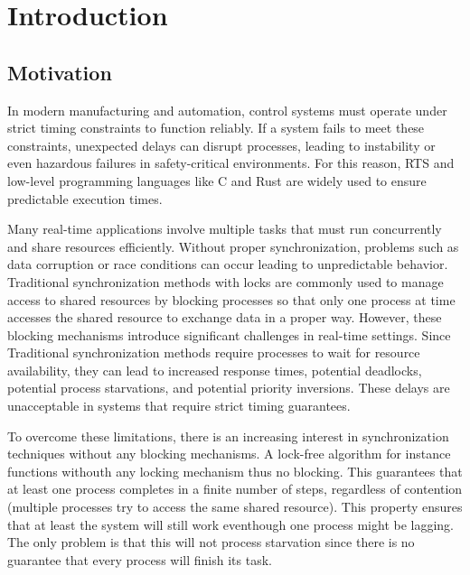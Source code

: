 \chapter{Introduction}\label{ch:introduction}

\section{Motivation}\label{sec:motivation}

In modern manufacturing and automation, control systems must operate under strict timing constraints to function reliably. If a system fails to meet these constraints, unexpected delays can disrupt processes, leading to instability or even hazardous failures in safety-critical environments. For this reason, \ac{RTS} and low-level programming languages like C and Rust are widely used to ensure predictable execution times.

Many real-time applications involve multiple tasks that must run concurrently and share resources efficiently. Without proper synchronization, problems such as data corruption or race conditions can occur leading to unpredictable behavior. Traditional synchronization methods with locks are commonly used to manage access to shared resources by blocking processes so that only one process at time accesses the shared resource to exchange data in a proper way. However, these blocking mechanisms introduce significant challenges in real-time settings. Since Traditional synchronization methods require processes to wait for resource availability, they can lead to increased response times, potential deadlocks, potential process starvations, and potential priority inversions. These delays are unacceptable in systems that require strict timing guarantees. \cite{herlihy1991wait, brandenburg2019multiprocessorrealtimelockingprotocols, kode2024analysisSynchronization}

To overcome these limitations, there is an increasing interest in synchronization techniques without any blocking mechanisms. A lock-free algorithm for instance functions withouth any locking mechanism thus no blocking. This guarantees that at least one process completes in a finite number of steps, regardless of contention (multiple processes try to access the same shared resource). This property ensures that at least the system will still work eventhough one process might be lagging. The only problem is that this will not process starvation since there is no guarantee that every process will finish its task. \cite{kogan2012methodology}

